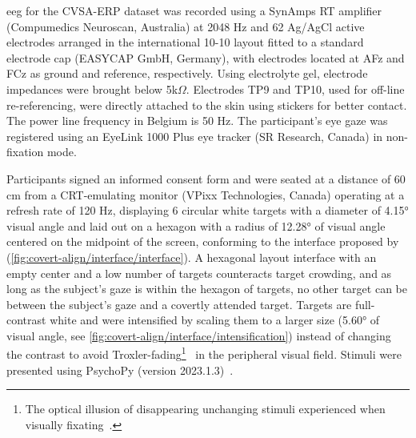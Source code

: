 \ac{eeg} for the CVSA-ERP dataset was recorded using a SynAmps RT amplifier
(Compumedics Neuroscan, Australia) at 2048 Hz and 62 Ag/AgCl active electrodes arranged in the
international 10-10 layout fitted to a standard electrode cap (EASYCAP GmbH,
Germany), with electrodes located at AFz and FCz as ground and reference, respectively.
Using electrolyte gel, electrode impedances were brought below 5k$\Omega$.
Electrodes TP9 and TP10, used for off-line re-referencing, were directly
attached to the skin using stickers for better contact.
The power line frequency in Belgium is 50 Hz.
The participant's eye gaze was registered using an EyeLink 1000 Plus eye tracker (SR Research,
Canada) in non-fixation mode.

Participants signed an informed consent form and were seated at a distance of
60 cm from a CRT-emulating monitor (VPixx
Technologies, Ca\-na\-da) operating at a refresh rate of 120 Hz, displaying 6
circular white targets with a diameter of 4.15° visual angle and laid out on a hexagon
with a radius of 12.28° of visual angle centered on the midpoint of the screen,
conforming to the interface proposed by \textcite{Treder2010}
(\cref{fig:covert-align/interface/interface}).
A hexagonal layout interface with an empty center and a low number of targets
counteracts target crowding, and as long as the subject’s gaze is within the hexagon of
targets, no other target can be between the subject’s gaze and a covertly
attended target.
Targets are full-contrast white and were intensified by scaling them to a
larger size (5.60° of visual angle, see \cref{fig:covert-align/interface/intensification})
instead of changing the contrast to avoid Troxler-fading\footnote{The optical illusion of disappearing unchanging stimuli
experienced when visually fixating~\cite{Troxler1804}.}~\cite{Treder2010} in the
peripheral visual field.
Stimuli were presented using PsychoPy (version 2023.1.3)~\cite{Peirce2019}.

